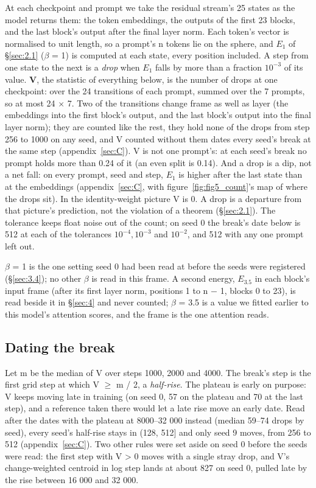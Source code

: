 \documentclass[11pt]{article}
\begin{document}
At each checkpoint and prompt we take the residual stream's 25 states as the model returns them: the token embeddings, the outputs of the first 23 blocks, and the last block's output after the final layer norm. Each token's vector is normalised to unit length, so a prompt's n tokens lie on the sphere, and $E_{1}$ of \S\ref{sec:2.1} ($\beta $ = 1) is computed at each state, every position included. A step from one state to the next is a \emph{drop} when $E_{1}$ falls by more than a fraction $10^{-3}$ of its value. \textbf{V}, the statistic of everything below, is the number of drops at one checkpoint: over the 24 transitions of each prompt, summed over the 7 prompts, so at most 24 $\times $ 7. Two of the transitions change frame as well as layer (the embeddings into the first block's output, and the last block's output into the final layer norm); they are counted like the rest, they hold none of the drops from step 256 to 1000 on any seed, and V counted without them dates every seed's break at the same step (appendix~\ref{sec:C}). V is not one prompt's: at each seed's break no prompt holds more than 0.24 of it (an even split is 0.14). And a drop is a dip, not a net fall: on every prompt, seed and step, $E_{1}$ is higher after the last state than at the embeddings (appendix~\ref{sec:C}, with figure~\ref{fig:fig5_count}'s map of where the drops sit). In the identity-weight picture V is 0. A drop is a departure from that picture's prediction, not the violation of a theorem (\S\ref{sec:2.1}). The tolerance keeps float noise out of the count; on seed 0 the break's date below is 512 at each of the tolerances $10^{-4}, 10^{-3}$ and $10^{-2}$, and 512 with any one prompt left out.

$\beta $ = 1 is the one setting seed 0 had been read at before the seeds were registered (\S\ref{sec:3.4}); no other $\beta $ is read in this frame. A second energy, $E_{3.5}$ in each block's input frame (after its first layer norm, positions 1 to n $-$ 1, blocks 0 to 23), is read beside it in \S\ref{sec:4} and never counted; $\beta $ = 3.5 is a value we fitted earlier to this model's attention scores, and the frame is the one attention reads.

\subsection{Dating the break}\label{sec:3.3}

Let m be the median of V over steps 1000, 2000 and 4000. The break's step is the first grid step at which V $\geq $ m / 2, a \emph{half-rise}. The plateau is early on purpose: V keeps moving late in training (on seed 0, 57 on the plateau and 70 at the last step), and a reference taken there would let a late rise move an early date. Read after the dates with the plateau at 8000--32 000 instead (median 59--74 drops by seed), every seed's half-rise stays in (128, 512] and only seed 9 moves, from 256 to 512 (appendix~\ref{sec:C}). Two other rules were set aside on seed 0 before the seeds were read: the first step with V > 0 moves with a single stray drop, and V's change-weighted centroid in log step lands at about 827 on seed 0, pulled late by the rise between 16 000 and 32 000.
\end{document}
